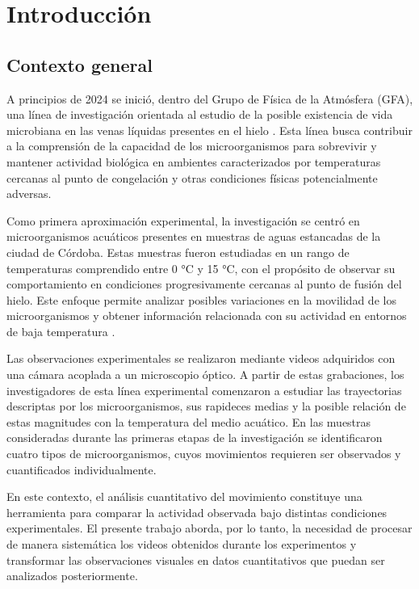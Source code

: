 \chapter{Introducción}

\section{Contexto general}

A principios de 2024 se inició, dentro del Grupo de Física de la Atmósfera (GFA), una línea de investigación orientada al estudio de la posible existencia de vida microbiana en las venas líquidas presentes en el hielo \cite{mader2006,rohde2007,dani2012}. Esta línea busca contribuir a la comprensión de la capacidad de los microorganismos para sobrevivir y mantener actividad biológica en ambientes caracterizados por temperaturas cercanas al punto de congelación y otras condiciones físicas potencialmente adversas.

Como primera aproximación experimental, la investigación se centró en microorganismos acuáticos presentes en muestras de aguas estancadas de la ciudad de Córdoba. Estas muestras fueron estudiadas en un rango de temperaturas comprendido entre 0 °C y 15 °C, con el propósito de observar su comportamiento en condiciones progresivamente cercanas al punto de fusión del hielo. Este enfoque permite analizar posibles variaciones en la movilidad de los microorganismos y obtener información relacionada con su actividad en entornos de baja temperatura \cite{pedernera2024}.

Las observaciones experimentales se realizaron mediante videos adquiridos con una cámara acoplada a un microscopio óptico. A partir de estas grabaciones, los investigadores de esta línea experimental comenzaron a estudiar las trayectorias descriptas por los microorganismos, sus rapideces medias y la posible relación de estas magnitudes con la temperatura del medio acuático. En las muestras consideradas durante las primeras etapas de la investigación se identificaron cuatro tipos de microorganismos, cuyos movimientos requieren ser observados y cuantificados individualmente.

En este contexto, el análisis cuantitativo del movimiento constituye una herramienta para comparar la actividad observada bajo distintas condiciones experimentales. El presente trabajo aborda, por lo tanto, la necesidad de procesar de manera sistemática los videos obtenidos durante los experimentos y transformar las observaciones visuales en datos cuantitativos que puedan ser analizados posteriormente.

